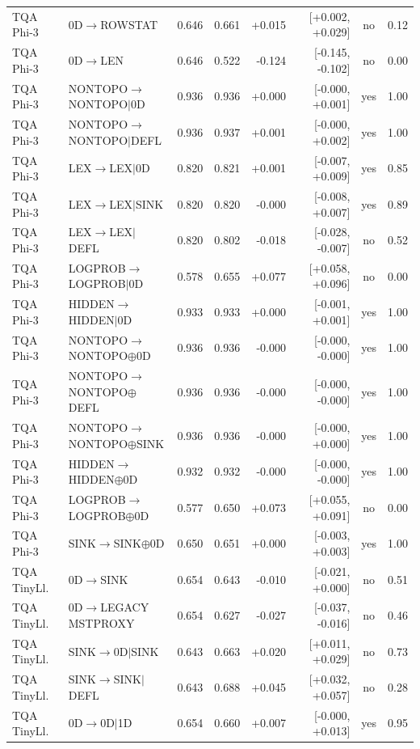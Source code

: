 \begin{longtable}{llrrrrcc}
TQA Phi-3 & 0D$\to$ROWSTAT & 0.646 & 0.661 & +0.015 & [+0.002, +0.029] & no & 0.12 \\
TQA Phi-3 & 0D$\to$LEN & 0.646 & 0.522 & -0.124 & [-0.145, -0.102] & no & 0.00 \\
TQA Phi-3 & NONTOPO$\to$NONTOPO$\mid$0D & 0.936 & 0.936 & +0.000 & [-0.000, +0.001] & yes & 1.00 \\
TQA Phi-3 & NONTOPO$\to$NONTOPO$\mid$DEFL & 0.936 & 0.937 & +0.001 & [-0.000, +0.002] & yes & 1.00 \\
TQA Phi-3 & LEX$\to$LEX$\mid$0D & 0.820 & 0.821 & +0.001 & [-0.007, +0.009] & yes & 0.85 \\
TQA Phi-3 & LEX$\to$LEX$\mid$SINK & 0.820 & 0.820 & -0.000 & [-0.008, +0.007] & yes & 0.89 \\
TQA Phi-3 & LEX$\to$LEX$\mid$DEFL & 0.820 & 0.802 & -0.018 & [-0.028, -0.007] & no & 0.52 \\
TQA Phi-3 & LOGPROB$\to$LOGPROB$\mid$0D & 0.578 & 0.655 & +0.077 & [+0.058, +0.096] & no & 0.00 \\
TQA Phi-3 & HIDDEN$\to$HIDDEN$\mid$0D & 0.933 & 0.933 & +0.000 & [-0.001, +0.001] & yes & 1.00 \\
TQA Phi-3 & NONTOPO$\to$NONTOPO$\oplus$0D & 0.936 & 0.936 & -0.000 & [-0.000, -0.000] & yes & 1.00 \\
TQA Phi-3 & NONTOPO$\to$NONTOPO$\oplus$DEFL & 0.936 & 0.936 & -0.000 & [-0.000, -0.000] & yes & 1.00 \\
TQA Phi-3 & NONTOPO$\to$NONTOPO$\oplus$SINK & 0.936 & 0.936 & -0.000 & [-0.000, +0.000] & yes & 1.00 \\
TQA Phi-3 & HIDDEN$\to$HIDDEN$\oplus$0D & 0.932 & 0.932 & -0.000 & [-0.000, -0.000] & yes & 1.00 \\
TQA Phi-3 & LOGPROB$\to$LOGPROB$\oplus$0D & 0.577 & 0.650 & +0.073 & [+0.055, +0.091] & no & 0.00 \\
TQA Phi-3 & SINK$\to$SINK$\oplus$0D & 0.650 & 0.651 & +0.000 & [-0.003, +0.003] & yes & 1.00 \\
TQA TinyLl. & 0D$\to$SINK & 0.654 & 0.643 & -0.010 & [-0.021, +0.000] & no & 0.51 \\
TQA TinyLl. & 0D$\to$LEGACY MSTPROXY & 0.654 & 0.627 & -0.027 & [-0.037, -0.016] & no & 0.46 \\
TQA TinyLl. & SINK$\to$0D$\mid$SINK & 0.643 & 0.663 & +0.020 & [+0.011, +0.029] & no & 0.73 \\
TQA TinyLl. & SINK$\to$SINK$\mid$DEFL & 0.643 & 0.688 & +0.045 & [+0.032, +0.057] & no & 0.28 \\
TQA TinyLl. & 0D$\to$0D$\mid$1D & 0.654 & 0.660 & +0.007 & [-0.000, +0.013] & yes & 0.95 \\

\end{longtable}
